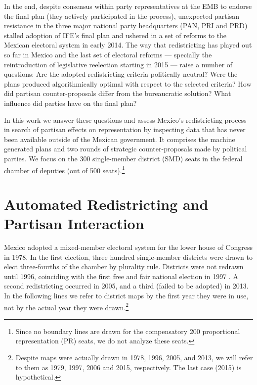 \documentclass[letter,12pt]{article}
\begin{document}


In the end, despite consensus within party representatives at the EMB to endorse the final plan (they actively participated in the process), unexpected partisan resistance in the three major national party headquarters (PAN, PRI and PRD) stalled adoption of IFE's final plan and ushered in a set of reforms to the Mexican electoral system in early 2014. The way that redistricting has played out so far in Mexico and the last set of electoral reforms --- specially the reintroduction of legislative reelection starting in 2015 --- raise a number of questions: Are the adopted redistricting criteria politically neutral? Were the plans produced algorithmically optimal with respect to the selected criteria? How did partisan counter-proposals differ from the bureaucratic solution? What influence did parties have on the final plan? 

In this work we answer these questions and assess Mexico's redistricting process in search of partisan effects on representation by inspecting data that has never been available outside of the Mexican government. It comprises the machine generated plans and two rounds of strategic counter-proposals made by political parties. We focus on the 300 single-member district (SMD) seats in the federal chamber of deputies (out of 500 seats).\footnote{Since no boundary lines are drawn for the compensatory 200 proportional representation (PR) seats, we do not analyze these seats.} 

\section{Automated Redistricting and Partisan Interaction}

Mexico adopted a mixed-member electoral system for the lower house of Congress in 1978. In the first election, three hundred single-member districts were drawn to elect three-fourths of the chamber by plurality rule. Districts were not redrawn until 1996, coinciding with the first free and fair national election in 1997 \citep{lujambio.vives.2008,trelles.mtz.tesisItam.2007}. A second redistricting occurred in 2005, and a third (failed to be adopted) in 2013. In the following lines we refer to district maps by the first year they were in use, not by the actual year they were drawn.\footnote{Despite maps were actually drawn in 1978, 1996, 2005, and 2013, we will refer to them as 1979, 1997, 2006 and 2015, respectively. The last case (2015) is hypothetical.}
\end{document}
